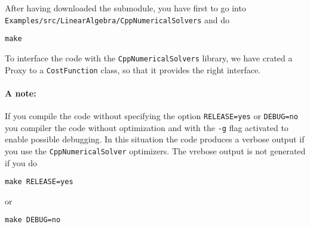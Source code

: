 \documentclass{article}
\begin{document}
After having downloaded the submodule, you have first to go into \texttt{Examples/src/LinearAlgebra/CppNumericalSolvers} and do
\begin{verbatim}
make
\end{verbatim}

To interface the code with the \texttt{CppNumericalSolvers} library, we have crated a Proxy to a \texttt{CostFunction} class, so that it provides the right interface.

\paragraph{A note:} If you compile the code without specifying the option \texttt{RELEASE=yes} or \texttt{DEBUG=no} you compiler the code without optimization and with the \texttt{-g} flag
activated to enable possible debugging. In this situation the code produces a verbose output if you use the \texttt{CppNumericalSolver} optimizers. The vrebose output is not generated if you
do
\begin{verbatim}
make RELEASE=yes
\end{verbatim}
or
\begin{verbatim}
make DEBUG=no
\end{verbatim}
\end{document}
